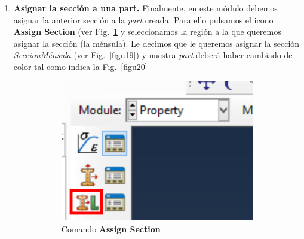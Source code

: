 \begin{enumerate}
\item \textbf{Asignar la sección a una part.}  Finalmente, en este
  módulo debemos asignar la anterior sección a la \textit{part}
  creada. Para ello pulsamos el icono \textbf{Assign Section} (ver
  Fig.~\ref{figu21} y seleccionamos la región a la que queremos
  asignar la sección (la ménsula). Le decimos que le queremos asignar
  la sección \textit{SeccionMénsula} (ver Fig.~\ref{figu19}) y nuestra
  \textit{part} deberá haber cambiado de color tal como indica la
  Fig.~\ref{figu20}
  \begin{figure}[H]
    \centering
    \begin{subfigure}{0.19\textwidth}
      \includegraphics[width=\textwidth]{./body/images/imagen21.pdf}
      \caption{Comando \textbf{Assign Section}}
      \label{figu21}
    \end{subfigure}%
    ~ %
    \begin{subfigure}{0.29\textwidth}

\end{subfigure}
\end{figure}
\end{enumerate}
